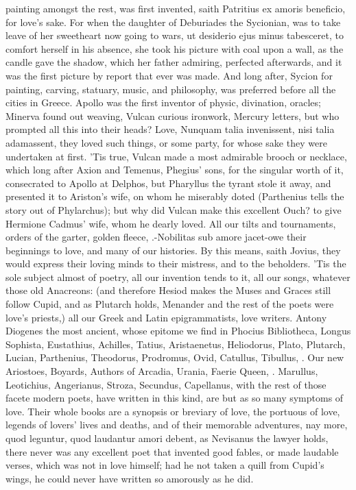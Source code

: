 {painting amongst the rest, was first invented, saith Patritius ex
amoris beneficio, for love's sake. For when the daughter of
Deburiades the Sycionian, was to take leave of her sweetheart now
going to wars, ut desiderio ejus minus tabesceret, to comfort herself
in his absence, she took his picture with coal upon a wall, as the
candle gave the shadow, which her father admiring, perfected
afterwards, and it was the first picture by report that ever was made.
And long after, Sycion for painting, carving, statuary, music, and
philosophy, was preferred before all the cities in Greece. Apollo
was the first inventor of physic, divination, oracles; Minerva found
out weaving, Vulcan curious ironwork, Mercury letters, but who prompted
all this into their heads? Love, Nunquam talia invenissent, nisi talia
adamassent, they loved such things, or some party, for whose sake they
were undertaken at first. 'Tis true, Vulcan made a most admirable
brooch or necklace, which long after Axion and Temenus, Phegius' sons,
for the singular worth of it, consecrated to Apollo at Delphos, but
Pharyllus the tyrant stole it away, and presented it to Ariston's wife,
on whom he miserably doted (Parthenius tells the story out of
Phylarchus); but why did Vulcan make this excellent Ouch? to give
Hermione Cadmus' wife, whom he dearly loved. All our tilts and
tournaments, orders of the garter, golden fleece, \etc{}.-Nobilitas sub
amore jacet-owe their beginnings to love, and many of our histories. By
this means, saith Jovius, they would express their loving minds to
their mistress, and to the beholders. 'Tis the sole subject almost of
poetry, all our invention tends to it, all our songs, whatever those
old Anacreons: (and therefore Hesiod makes the Muses and Graces still
follow Cupid, and as Plutarch holds, Menander and the rest of the poets
were love's priests,) all our Greek and Latin epigrammatists, love
writers. Antony Diogenes the most ancient, whose epitome we find in
Phocius Bibliotheca, Longus Sophista, Eustathius, Achilles, Tatius,
Aristaenetus, Heliodorus, Plato, Plutarch, Lucian, Parthenius,
Theodorus, Prodromus, Ovid, Catullus, Tibullus, \etc{}. Our new Ariostoes,
Boyards, Authors of Arcadia, Urania, Faerie Queen, \etc{}. Marullus,
Leotichius, Angerianus, Stroza, Secundus, Capellanus, \etc{} with the rest
of those facete modern poets, have written in this kind, are but as so
many symptoms of love. Their whole books are a synopsis or breviary of
love, the portuous of love, legends of lovers' lives and deaths, and of
their memorable adventures, nay more, quod leguntur, quod laudantur
amori debent, as Nevisanus the lawyer holds, there never was any
excellent poet that invented good fables, or made laudable verses,
which was not in love himself; had he not taken a quill from Cupid's
wings, he could never have written so amorously as he did.

}
